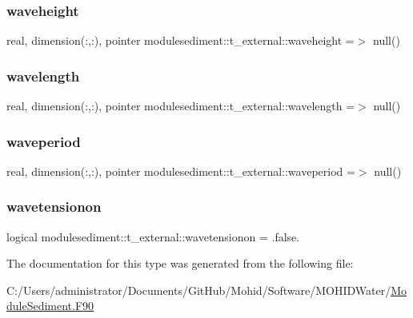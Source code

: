 \subsubsection{\texorpdfstring{waveheight}{waveheight}}
{\footnotesize\ttfamily real, dimension(\+:,\+:), pointer modulesediment\+::t\+\_\+external\+::waveheight =$>$ null()\hspace{0.3cm}{\ttfamily [private]}}

\mbox{\label{structmodulesediment_1_1t__external_ae6a0fbb5c51550eddeb058192d1e87a6}} 
\subsubsection{\texorpdfstring{wavelength}{wavelength}}
{\footnotesize\ttfamily real, dimension(\+:,\+:), pointer modulesediment\+::t\+\_\+external\+::wavelength =$>$ null()\hspace{0.3cm}{\ttfamily [private]}}

\mbox{\label{structmodulesediment_1_1t__external_a0a0943b3e997d413982b530ad0d940f3}} 
\subsubsection{\texorpdfstring{waveperiod}{waveperiod}}
{\footnotesize\ttfamily real, dimension(\+:,\+:), pointer modulesediment\+::t\+\_\+external\+::waveperiod =$>$ null()\hspace{0.3cm}{\ttfamily [private]}}

\mbox{\label{structmodulesediment_1_1t__external_add86315e15f690dc95eeaa9f189bfc50}} 
\subsubsection{\texorpdfstring{wavetensionon}{wavetensionon}}
{\footnotesize\ttfamily logical modulesediment\+::t\+\_\+external\+::wavetensionon = .false.\hspace{0.3cm}{\ttfamily [private]}}



The documentation for this type was generated from the following file\+:\begin{DoxyCompactItemize}
\item 
C\+:/\+Users/administrator/\+Documents/\+Git\+Hub/\+Mohid/\+Software/\+M\+O\+H\+I\+D\+Water/\mbox{\hyperlink{_module_sediment_8_f90}{Module\+Sediment.\+F90}}\end{DoxyCompactItemize}
